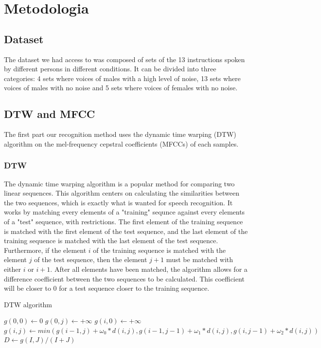 \documentclass[%
  report,%
  10pt,%
  a4paper,%
  fleqn,%
  oneside,%
  sumario = tradicional,%
  chapter = TITLE,%
  section = TITLE,%
]{abntex2}
\begin{document}
\section{Metodologia}\label{sec:met}

\subsection{Dataset}

The dataset we had access to was composed of sets of the 13 instructions spoken by different persons in different conditions.
It can be divided into three categories: 4 sets where voices of males with a high level of noise, 13 sets where voices of males with no noise and 5 sets where voices of females with no noise.

\subsection{DTW and MFCC}

The first part our recognition method uses the dynamic time warping (DTW) algorithm on the mel-frequency cepstral coefficients (MFCCs) of each samples.

\subsubsection{DTW}

The dynamic time warping algorithm is a popular method for comparing two linear sequences.
This algorithm centers on calculating the similarities between the two sequences, which is exactly what is wanted for speech recognition.
It works by matching every elements of a "training" sequnce against every elements of a "test" sequence, with restrictions.
The first element of the training sequence is matched with the first element of the test sequence, and the last element of the training sequence is matched with the last element of the test sequence.
Furthermore, if the element $i$ of the training sequence is matched with the element $j$ of the test sequence, then the element $j + 1$ must be matched with either $i$ or $i + 1$.
After all elements have been matched, the algorithm allows for a difference coefficient between the two sequences to be calculated.
This coefficient will be closer to 0 for a test sequence closer to the training sequence.

\begin{algorithm}
  \caption{DTW algorithm}\label{euclid}
  \begin{algorithmic}
    \State $g(0, 0) \gets 0$
    \State $g(0, j) \gets +\infty$
    \EndFor
    \State $g(i, 0) \gets +\infty$
    \State $g(i, j) \gets min(g(i - 1, j) + \omega_{0} * d(i, j), g(i - 1, j - 1) + \omega_{1} * d(i, j), g(i, j - 1) + \omega_{2} * d(i, j))$
    \EndFor
    \EndFor
    \State $D \gets g(I, J) / (I + J)$
  \end{algorithmic}
\end{algorithm}
\end{document}
